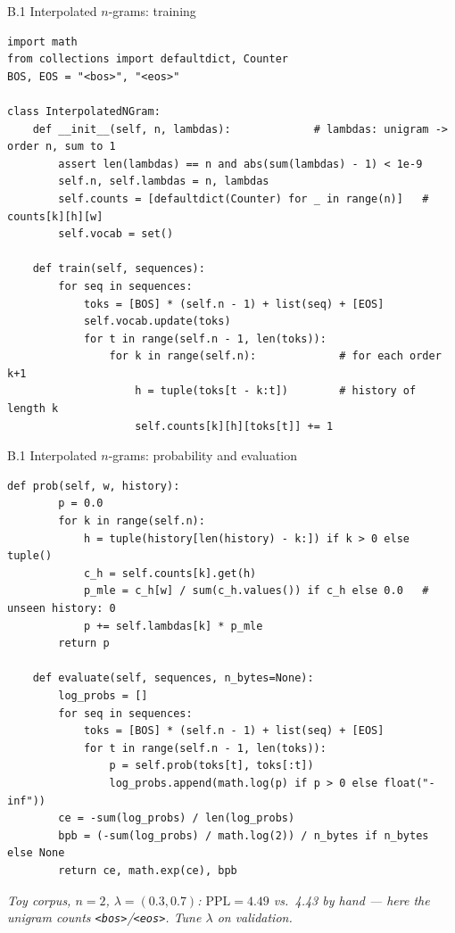 \documentclass[11pt,aspectratio=169]{beamer}
\newcommand{\PPL}{\mathrm{PPL}}
\newcommand{\hook}[1]{{\small\textcolor{gray!60!black}{\textit{#1}}}}
\newcommand{\eos}{\texttt{<eos>}}
\newcommand{\bos}{\texttt{<bos>}}
\begin{document}
\begin{frame}[fragile]{B.1 Interpolated $n$-grams: training}
\begin{lstlisting}[style=py,basicstyle=\ttfamily\scriptsize]
import math
from collections import defaultdict, Counter
BOS, EOS = "<bos>", "<eos>"

class InterpolatedNGram:
    def __init__(self, n, lambdas):             # lambdas: unigram -> order n, sum to 1
        assert len(lambdas) == n and abs(sum(lambdas) - 1) < 1e-9
        self.n, self.lambdas = n, lambdas
        self.counts = [defaultdict(Counter) for _ in range(n)]   # counts[k][h][w]
        self.vocab = set()

    def train(self, sequences):
        for seq in sequences:
            toks = [BOS] * (self.n - 1) + list(seq) + [EOS]
            self.vocab.update(toks)
            for t in range(self.n - 1, len(toks)):
                for k in range(self.n):             # for each order k+1
                    h = tuple(toks[t - k:t])        # history of length k
                    self.counts[k][h][toks[t]] += 1
\end{lstlisting}
\end{frame}

\begin{frame}[fragile]{B.1 Interpolated $n$-grams: probability and evaluation}
\begin{lstlisting}[style=py,basicstyle=\ttfamily\tiny]
    def prob(self, w, history):
        p = 0.0
        for k in range(self.n):
            h = tuple(history[len(history) - k:]) if k > 0 else tuple()
            c_h = self.counts[k].get(h)
            p_mle = c_h[w] / sum(c_h.values()) if c_h else 0.0   # unseen history: 0
            p += self.lambdas[k] * p_mle
        return p

    def evaluate(self, sequences, n_bytes=None):
        log_probs = []
        for seq in sequences:
            toks = [BOS] * (self.n - 1) + list(seq) + [EOS]
            for t in range(self.n - 1, len(toks)):
                p = self.prob(toks[t], toks[:t])
                log_probs.append(math.log(p) if p > 0 else float("-inf"))
        ce = -sum(log_probs) / len(log_probs)
        bpb = (-sum(log_probs) / math.log(2)) / n_bytes if n_bytes else None
        return ce, math.exp(ce), bpb
\end{lstlisting}
\vspace{-0.2em}
\hook{Toy corpus, $n=2$, $\lambda=(0.3,0.7)$: $\PPL = 4.49$ vs.\ 4.43 by hand --- here the unigram
counts \bos/\eos. Tune $\lambda$ on validation.}
\end{frame}
\end{document}
